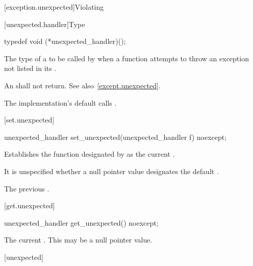 [exception.unexpected]{Violating }

[unexpected.handler]{Type }

%
\begin{itemdecl}
typedef void (*unexpected_handler)();
\end{itemdecl}

\begin{itemdescr}
\pnum
The type of a
to be called by
when a function attempts to throw an exception not listed in its
.

\pnum
\required
An
shall not return.
See also~\ref{except.unexpected}.

\pnum
{}
The implementation's default  calls
.
\end{itemdescr}

[set.unexpected]{}

%
\begin{itemdecl}
unexpected_handler set_unexpected(unexpected_handler f) noexcept;
\end{itemdecl}

\begin{itemdescr}
\pnum
\effects
Establishes the function designated by  as the current
.

\pnum
\remark It is unspecified whether a null pointer value designates the default
.

\pnum
\returns
The previous .
\end{itemdescr}

[get.unexpected]{}

\begin{itemdecl}
unexpected_handler get_unexpected() noexcept;
\end{itemdecl}

\begin{itemdescr}
\pnum
\returns The current .
\enternote This may be a null pointer value. \exitnote
\end{itemdescr}

[unexpected]{}

